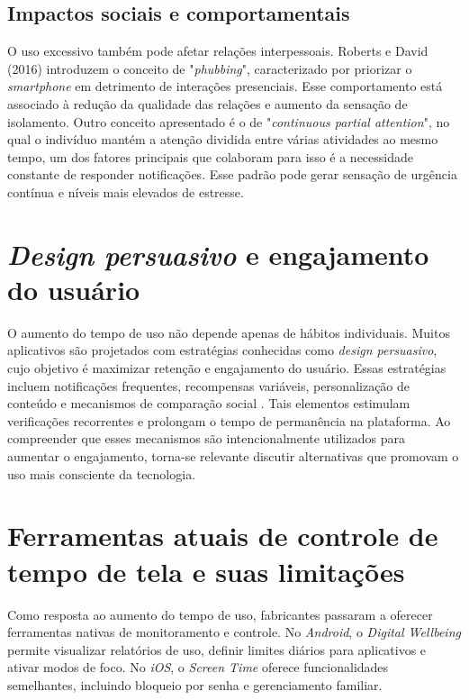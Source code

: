 \subsection{Impactos sociais e comportamentais}

O uso excessivo também pode afetar relações interpessoais. Roberts e David (2016) introduzem o conceito de "\textit{phubbing}", caracterizado por priorizar o \textit{smartphone} em detrimento de interações presenciais. Esse comportamento está associado à redução da qualidade das relações e aumento da sensação de isolamento. Outro conceito apresentado é o de "\textit{continuous partial attention}", no qual o indivíduo mantém a atenção dividida entre várias atividades ao mesmo tempo, um dos fatores principais que colaboram para isso é a necessidade constante de responder notificações. Esse padrão pode gerar sensação de urgência contínua e níveis mais elevados de estresse.

\section{\textit{Design persuasivo} e engajamento do usuário}

O aumento do tempo de uso não depende apenas de hábitos individuais. Muitos aplicativos são projetados com estratégias conhecidas como \textit{design persuasivo}, cujo objetivo é maximizar retenção e engajamento do usuário. Essas estratégias incluem notificações frequentes, recompensas variáveis, personalização de conteúdo e mecanismos de comparação social \cite{chen2023}. Tais elementos estimulam verificações recorrentes e prolongam o tempo de permanência na plataforma. Ao compreender que esses mecanismos são intencionalmente utilizados para aumentar o engajamento, torna-se relevante discutir alternativas que promovam o uso mais consciente da tecnologia.

\section{Ferramentas atuais de controle de tempo de tela e suas limitações}

Como resposta ao aumento do tempo de uso, fabricantes passaram a oferecer ferramentas nativas de monitoramento e controle. No \textit{Android}, o \textit{Digital Wellbeing} permite visualizar relatórios de uso, definir limites diários para aplicativos e ativar modos de foco. No \textit{iOS}, o \textit{Screen Time} oferece funcionalidades semelhantes, incluindo bloqueio por senha e gerenciamento familiar.

